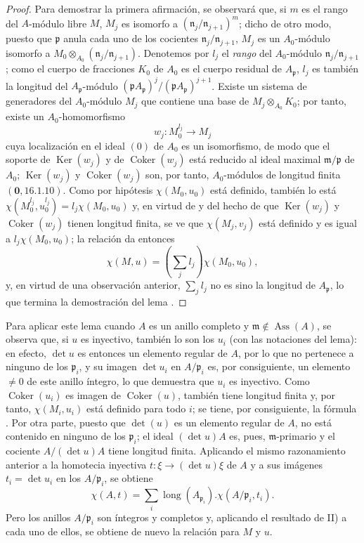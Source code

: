 \begin{proof}
Para demostrar la primera afirmación, se observará que, si $m$ es el rango del $A$-módulo libre $M$, $M_j$ es isomorfo a $(\mathfrak{n}_j/\mathfrak{n}_{j+1})^m$; dicho de otro modo, puesto que $\mathfrak{p}$ anula cada uno de los cocientes $\mathfrak{n}_j/\mathfrak{n}_{j+1}$, $M_j$ es un $A_0$-módulo isomorfo a $M_0\otimes_{A_0}(\mathfrak{n}_j/\mathfrak{n}_{j+1})$.
Denotemos por $l_j$ el \emph{rango} del $A_0$-módulo $\mathfrak{n}_j/\mathfrak{n}_{j+1}$;
como el cuerpo de fracciones $K_0$ de $A_0$ es el cuerpo residual de $A_{\mathfrak{p}}$, $l_j$ es también la longitud del $A_{\mathfrak{p}}$-módulo $(\mathfrak{p}A_{\mathfrak{p}})^j/(\mathfrak{p}A_{\mathfrak{p}})^{j+1}$.
Existe un sistema de generadores del $A_0$-módulo $M_j$ que contiene una base de $M_j\otimes_{A_0}K_0$;
por tanto, existe un $A_0$-homomorfismo
\[
  w_j:M_0^{l_j}\to M_j
\]
cuya localización en el ideal $(0)$ de $A_0$ es un isomorfismo, de modo que el soporte de $\operatorname{Ker}(w_j)$ y de $\operatorname{Coker}(w_j)$ está reducido al ideal maximal $\mathfrak{m}/\mathfrak{p}$ de $A_0$;
$\operatorname{Ker}(w_j)$ y $\operatorname{Coker}(w_j)$ son, por tanto, $A_0$-módulos de longitud finita $(\mathbf{0},16.1.10)$.
Como por hipótesis $\chi(M_0,u_0)$ está definido, también lo está $\chi(M_0^{l_j},u_0^{l_j})=l_j\chi(M_0,u_0)$ y, en virtud de  y del hecho de que $\operatorname{Ker}(w_j)$ y $\operatorname{Coker}(w_j)$ tienen longitud finita, se ve que $\chi(M_j,v_j)$ está definido y es igual a $l_j\chi(M_0,u_0)$;
la relación  da entonces
\[
  \chi(M,u)=\left(\sum_jl_j\right)\chi(M_0,u_0),
\]
y, en virtud de una observación anterior, $\sum_jl_j$ no es sino la longitud de $A_{\mathfrak{p}}$, lo que termina la demostración del lema .
\end{proof}

Para aplicar este lema cuando $A$ es un anillo completo y $\mathfrak{m}\notin\operatorname{Ass}(A)$, se observa que, si $u$ es inyectivo, también lo son los $u_i$ (con las notaciones del lema):
en efecto, $\det u$ es entonces un elemento regular de $A$, por lo que no pertenece a ninguno de los $\mathfrak{p}_i$, y su imagen $\det u_i$ en $A/\mathfrak{p}_i$ es, por consiguiente, un elemento $\neq0$ de este anillo íntegro, lo que demuestra que $u_i$ es inyectivo.
Como $\operatorname{Coker}(u_i)$ es imagen de $\operatorname{Coker}(u)$, también tiene longitud finita y, por tanto, $\chi(M_i,u_i)$ está definido para todo $i$;
se tiene, por consiguiente, la fórmula .
Por otra parte, puesto que $\det(u)$ es un elemento regular de $A$, no está contenido en ninguno de los $\mathfrak{p}_i$;
el ideal $(\det u)A$ es, pues, $\mathfrak{m}$-primario y el cociente $A/(\det u)A$ tiene longitud finita.
Aplicando el mismo razonamiento anterior a la homotecia inyectiva $t:\xi\to(\det u)\xi$ de $A$ y a sus imágenes $t_i=\det u_i$ en los $A/\mathfrak{p}_i$, se obtiene
\[
  \chi(A,t)=\sum_i\operatorname{long}(A_{\mathfrak{p}_i}).\chi(A/\mathfrak{p}_i,t_i).
\]
Pero los anillos $A/\mathfrak{p}_i$ son íntegros y completos y, aplicando el resultado de II) a cada uno de ellos, se obtiene de nuevo la relación  para $M$ y $u$.

